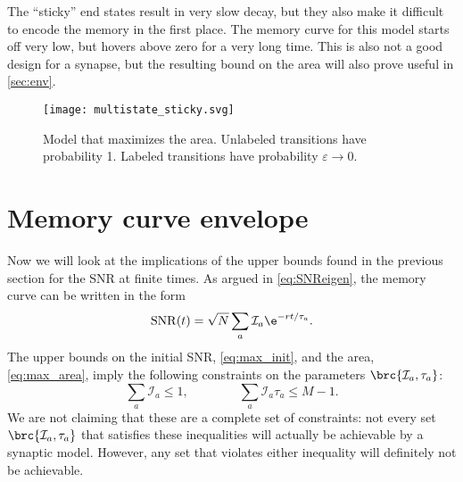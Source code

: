 \documentclass{article} %
\DeclareMathOperator{\snr}{SNR}
\newcommand{\CI}{\mathcal{I}}
\begin{document}
The ``sticky'' end states result in very slow decay, but they also make it difficult to encode the memory in the first place.
The memory curve for this model starts off very low, but hovers above zero for a very long time.
This is also not a good design for a synapse, but the resulting bound on the area will also prove useful in \autoref{sec:env}.


\begin{figure}[tbp]
 \begin{center}
  \texttt{[image: multistate\_sticky.svg]}
 \end{center}
  \caption{Model that maximizes the area.
  Unlabeled transitions have probability 1.
  Labeled transitions have probability $\varepsilon\to0$.
  }\label{fig:max_area}
\end{figure}



\section{Memory curve envelope}\label{sec:env}

Now we will look at the implications of the upper bounds found in the previous section for the SNR at finite times.
As argued in \eqref{eq:SNReigen}, the memory curve can be written in the form
%
\begin{equation}\label{eq:SNRmodes}
  \snr(t) = \sqrt{N}\sum_a \CI_a \e^{-rt/\tau_a}.
\end{equation}
%
The upper bounds on the initial SNR, \eqref{eq:max_init}, and the area, \eqref{eq:max_area}, imply the following constraints on the parameters $\brc{\CI_a,\tau_a}$:
%
\begin{equation}\label{eq:modeconstr}
  \sum_a \CI_a \leq 1,
  \qquad\qquad
  \sum_a \CI_a \tau_a \leq M-1.
\end{equation}
%
We are not claiming that these are a complete set of constraints: not every set $\brc{\CI_a,\tau_a}$ that satisfies these inequalities will actually be achievable by a synaptic model.
However, any set that violates either inequality will definitely not be achievable.
\end{document}
